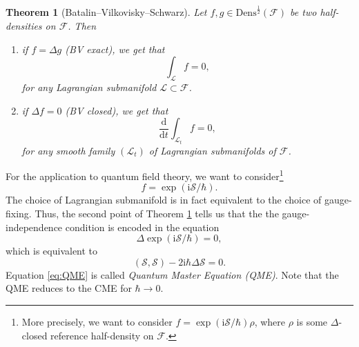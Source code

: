 \documentclass[11pt,colorinlistoftodos]{amsart}
\numberwithin{equation}{subsection}
\theoremstyle{plain}
\newtheorem{thm}{Theorem}[subsection]
\theoremstyle{definition}
\theoremstyle{remark}
\newcommand{\dd}{{\mathrm{d}}}
\newcommand{\calS}{\mathcal{S}}
\newcommand{\calL}{\mathcal{L}}
\newcommand{\calF}{\mathcal{F}}
\newcommand{\I}{\mathrm{i}}
\begin{document}
\begin{thm}[Batalin--Vilkovisky--Schwarz\cite{BV2,S}]
\label{thm:BV}
Let $f,g\in \mathrm{Dens}^{\frac{1}{2}}(\calF)$ be two half-densities on $\calF$. Then 
\begin{enumerate}
    \item if $f=\Delta g$ (\emph{BV exact}), we get that 
    \[
    \int_\calL f=0,
    \]
    for any Lagrangian submanifold $\calL\subset \calF$. 
    \item if $\Delta f=0$ (\emph{BV closed}), we get that 
    \[
    \frac{\dd}{\dd t}\int_{\calL_t}f=0,
    \]
    for any smooth family $(\calL_t)$ of Lagrangian submanifolds of $\calF$.
\end{enumerate}
\end{thm}

For the application to quantum field theory, we want to consider\footnote{More precisely, we want to consider $f=\exp(\I\calS/\hbar)\rho$, where $\rho$ is some $\Delta$-closed reference half-density on $\calF$.}
\[
f=\exp(\I\calS/\hbar).
\]
The choice of Lagrangian submanifold is in fact equivalent to the choice of gauge-fixing. Thus, the second point of Theorem \ref{thm:BV} tells us that the the gauge-independence condition is encoded in the equation
\[
\Delta\exp(\I\calS/\hbar)=0,
\]
which is equivalent to 
\begin{equation}
\label{eq:QME}
(\calS,\calS)-2\I\hbar\Delta\calS=0.
\end{equation}
Equation \eqref{eq:QME} is called \emph{Quantum Master Equation (QME)}. Note that the QME reduces to the CME for $\hbar\to 0$.
\end{document}
